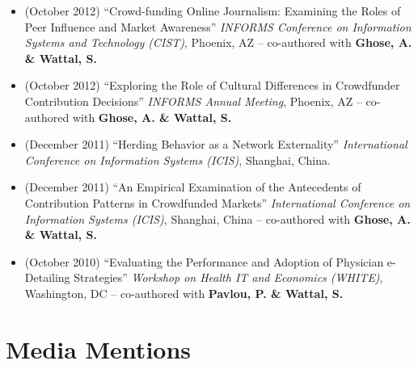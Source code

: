 \documentclass[10.5pt,letterpaper,sans]{moderncv}        %
\begin{document}
\begin{itemize}
\item (October 2012) ``Crowd-funding Online Journalism: Examining the Roles of Peer Influence and Market Awareness'' \textit{INFORMS Conference on Information Systems and Technology (CIST)}, Phoenix, AZ -- co-authored with \textbf{Ghose, A. \& Wattal, S.}

\item (October 2012) ``Exploring the Role of Cultural Differences in Crowdfunder Contribution Decisions'' \textit{INFORMS Annual Meeting}, Phoenix, AZ -- co-authored with \textbf{Ghose, A. \& Wattal, S.}

\item (December 2011) ``Herding Behavior as a Network Externality'' \textit{International Conference on Information Systems (ICIS)}, Shanghai, China.

\item (December 2011) ``An Empirical Examination of the Antecedents of Contribution Patterns in Crowdfunded Markets'' \textit{International Conference on Information Systems (ICIS)}, Shanghai, China -- co-authored with \textbf{Ghose, A. \& Wattal, S.}

\item (October 2010) ``Evaluating the Performance and Adoption of Physician e-Detailing Strategies'' \textit{Workshop on Health IT and Economics (WHITE)}, Washington, DC -- co-authored with \textbf{Pavlou, P. \& Wattal, S.}

\end{itemize}

\section{Media Mentions}
\end{document}
